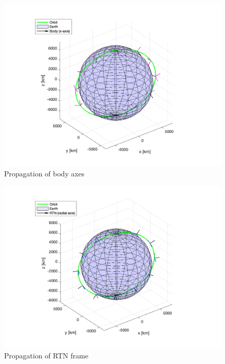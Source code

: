 \begin{figure}[H]
\centering
\includegraphics[scale=0.6]{Images/ps3_problem7c_body.png}
\caption{Propagation of body axes}
\label{fig:ps3_problem7c}
\end{figure}

\begin{figure}[H]
\centering
\includegraphics[scale=0.6]{Images/ps3_problem7c_rtn.png}
\caption{Propagation of RTN frame}
\label{fig:ps3_problem7c}
\end{figure}